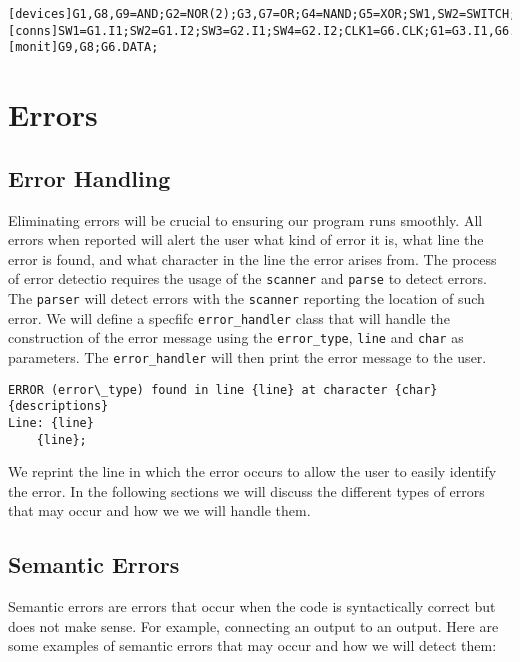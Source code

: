 \documentclass[10pt]{article}
\begin{document}
\begin{lstlisting}[caption=Obfuscated Code for Example 2]
	[devices]G1,G8,G9=AND;G2=NOR(2);G3,G7=OR;G4=NAND;G5=XOR;SW1,SW2=SWITCH;SW3,SW4=SWITCH(0);G6=DTYPE;CLK1=CLOCK(5);[conns]SW1=G1.I1;SW2=G1.I2;SW3=G2.I1;SW4=G2.I2;CLK1=G6.CLK;G1=G3.I1,G6.SET,G7.I1;G2=G3.I2,G4.I1;G3=G6.DATA;G4=G5.I1;G5=G6.CLEAR;G6.Q=G7I.2;G6.QBAR:G8.I1;G7=G9.I1;G8=G9.I2;[monit]G9,G8;G6.DATA;
\end{lstlisting}

\section{Errors}
\subsection{Error Handling}

Eliminating errors will be crucial to ensuring our program runs smoothly. All errors when reported will alert the user what kind of error it is, what line the error is found, and what character in the line the error arises from. The process of error detectio requires the usage of the \texttt{scanner} and \texttt{parse} to detect errors. The \texttt{parser} will detect errors with the \texttt{scanner} reporting the location of such error. We will define a specfifc \texttt{error\_handler} class that will handle the construction of the error message using the \texttt{error\_type}, \texttt{line} and \texttt{char} as parameters. The \texttt{error\_handler} will then print the error message to the user.

\begin{lstlisting}
ERROR (error\_type) found in line {line} at character {char}
{descriptions}
Line: {line}
	{line};
\end{lstlisting}

We reprint the line in which the error occurs to allow the user to easily identify the error. In the following sections we will discuss the different types of errors that may occur and how we we will handle them. 

\subsection{Semantic Errors}

Semantic errors are errors that occur when the code is syntactically correct but does not make sense. For example, connecting an output to an output. Here are some examples of semantic errors that may occur and how we will detect them:
\end{document}

